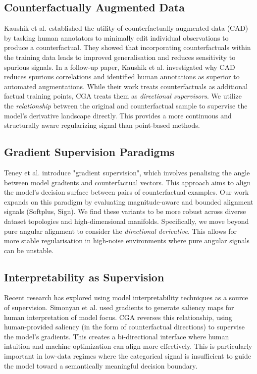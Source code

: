 \documentclass[sigconf,anonymous]{aamas}
\begin{document}
\subsection{Counterfactually Augmented Data}
Kaushik et al. \cite{Kaushik2020Learning} established the utility of counterfactually augmented data (CAD) by tasking human annotators to minimally edit individual observations to produce a counterfactual. They showed that incorporating counterfactuals within the training data leads to improved generalisation and reduces sensitivity to spurious signals. In a follow-up paper, Kaushik et al. investigated why CAD reduces spurious correlations \cite{kaushik2021explaining} and identified human annotations as superior to automated augmentations. While their work treats counterfactuals as additional factual training points, CGA treats them as \emph{directional supervisors}. We utilize the \emph{relationship} between the original and counterfactual sample to supervise the model's derivative landscape directly. This provides a more continuous and structurally aware regularizing signal than point-based methods.

\subsection{Gradient Supervision Paradigms}
Teney et al. \cite{teney2020learning} introduce "gradient supervision", which involves penalising the angle between model gradients and counterfactual vectors. This approach aims to align the model's decision surface between pairs of counterfactual examples. Our work expands on this paradigm by evaluating magnitude-aware and bounded alignment signals (Softplus, Sign). We find these variants to be more robust across diverse dataset topologies and high-dimensional manifolds. Specifically, we move beyond pure angular alignment to consider the \emph{directional derivative}. This allows for more stable regularisation in high-noise environments where pure angular signals can be unstable.

\subsection{Interpretability as Supervision}
Recent research has explored using model interpretability techniques as a source of supervision. Simonyan et al. \cite{simonyan2013deep} used gradients to generate saliency maps for human interpretation of model focus. CGA reverses this relationship, using human-provided saliency (in the form of counterfactual directions) to supervise the model's gradients. This creates a bi-directional interface where human intuition and machine optimization can align more effectively. This is particularly important in low-data regimes where the categorical signal is insufficient to guide the model toward a semantically meaningful decision boundary.
\end{document}
